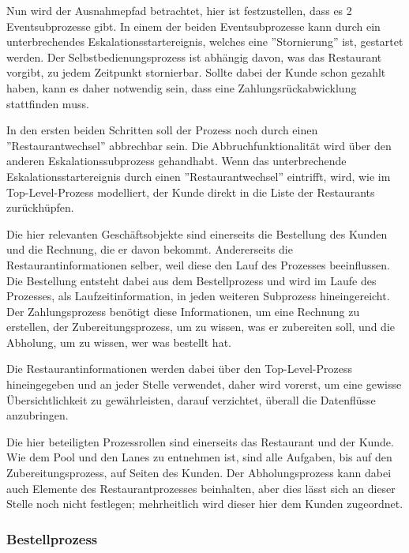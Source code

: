 Nun wird der Ausnahmepfad betrachtet, hier ist festzustellen, dass es 2 Eventsubprozesse gibt. In einem der beiden Eventsubprozesse kann durch ein unterbrechendes Eskalationsstartereignis, welches eine ''Stornierung'' ist, gestartet werden. Der Selbstbedienungsprozess ist abhängig davon, was das Restaurant vorgibt, zu jedem Zeitpunkt stornierbar. Sollte dabei der Kunde schon gezahlt haben, kann es daher notwendig sein, dass eine Zahlungsrückabwicklung stattfinden muss. 

In den ersten beiden Schritten soll der Prozess noch durch einen ''Restaurantwechsel'' abbrechbar sein. Die Abbruchfunktionalität wird über den anderen Eskalationssubprozess gehandhabt. Wenn das unterbrechende Eskalationsstartereignis durch einen ''Restaurantwechsel'' eintrifft, wird, wie im Top-Level-Prozess modelliert, der Kunde  direkt in die Liste der Restaurants zurückhüpfen.

Die hier relevanten Geschäftsobjekte sind einerseits die Bestellung des Kunden und die Rechnung, die er davon bekommt. Andererseits die Restaurantinformationen selber, weil diese den Lauf des Prozesses beeinflussen. Die Bestellung entsteht dabei aus dem Bestellprozess und wird im Laufe des Prozesses, als Laufzeitinformation, in jeden weiteren Subprozess hineingereicht. Der Zahlungsprozess benötigt diese Informationen, um eine Rechnung zu erstellen, der Zubereitungsprozess, um zu wissen, was er zubereiten soll, und die Abholung, um zu wissen, wer was bestellt hat.

Die Restaurantinformationen werden dabei über den Top-Level-Prozess hineingegeben und an jeder Stelle verwendet, daher wird vorerst, um eine gewisse Übersichtlichkeit zu gewährleisten, darauf verzichtet, überall die Datenflüsse anzubringen.

Die hier beteiligten Prozessrollen sind einerseits das Restaurant und der Kunde. Wie dem Pool und den Lanes zu entnehmen ist, sind alle Aufgaben, bis auf den Zubereitungsprozess, auf Seiten des Kunden. Der Abholungsprozess kann dabei auch Elemente des Restaurantprozesses beinhalten, aber dies lässt sich an dieser Stelle noch nicht festlegen; mehrheitlich wird dieser hier dem Kunden zugeordnet. 

\subsubsection{Bestellprozess}



